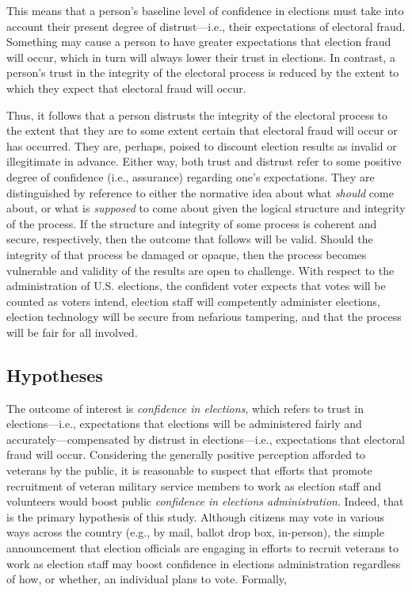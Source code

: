 \documentclass[
  12pt,
  letterpaper,
]{article}
\begin{document}
This means that a person's baseline level of confidence in elections
must take into account their present degree of distrust---i.e., their
expectations of electoral fraud. Something may cause a person to have
greater expectations that election fraud will occur, which in turn will
always lower their trust in elections. In contrast, a person's trust in
the integrity of the electoral process is reduced by the extent to which
they expect that electoral fraud will occur.

Thus, it follows that a person distrusts the integrity of the electoral
process to the extent that they are to some extent certain that
electoral fraud will occur or has occurred. They are, perhaps, poised to
discount election results as invalid or illegitimate in advance. Either
way, both trust and distrust refer to some positive degree of confidence
(i.e., assurance) regarding one's expectations. They are distinguished
by reference to either the normative idea about what \emph{should} come
about, or what is \emph{supposed} to come about given the logical
structure and integrity of the process. If the structure and integrity
of some process is coherent and secure, respectively, then the outcome
that follows will be valid. Should the integrity of that process be
damaged or opaque, then the process becomes vulnerable and validity of
the results are open to challenge. With respect to the administration of
U.S. elections, the confident voter expects that votes will be counted
as voters intend, election staff will competently administer elections,
election technology will be secure from nefarious tampering, and that
the process will be fair for all involved.

\subsection{Hypotheses}\label{hypotheses}

The outcome of interest is \emph{confidence in elections}, which refers
to trust in elections---i.e., expectations that elections will be
administered fairly and accurately---compensated by distrust in
elections---i.e., expectations that electoral fraud will occur.
Considering the generally positive perception afforded to veterans by
the public, it is reasonable to suspect that efforts that promote
recruitment of veteran military service members to work as election
staff and volunteers would boost public \emph{confidence in elections
administration}. Indeed, that is the primary hypothesis of this study.
Although citizens may vote in various ways across the country (e.g., by
mail, ballot drop box, in-person), the simple announcement that election
officials are engaging in efforts to recruit veterans to work as
election staff may boost confidence in elections administration
regardless of how, or whether, an individual plans to vote. Formally,
\end{document}
